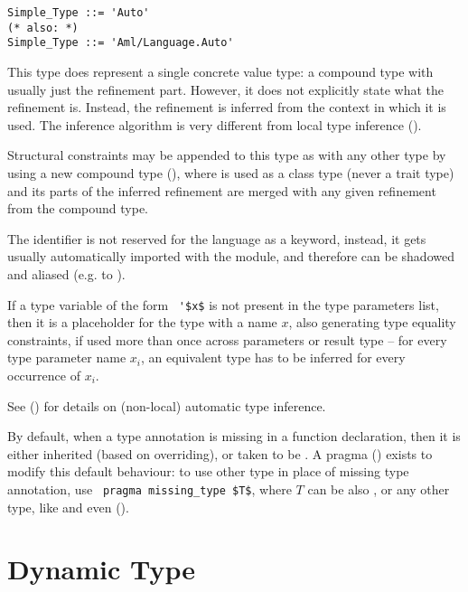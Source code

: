 \syntax\begin{lstlisting}[morekeywords={Auto},deletekeywords={also}]
Simple_Type ::= 'Auto'
(* also: *)
Simple_Type ::= 'Aml/Language.Auto'
\end{lstlisting}

This type does represent a single concrete value type: a compound type with usually just the refinement part. However, it does not explicitly state what the refinement is. Instead, the refinement is inferred from the context in which it is used. The inference algorithm is very different from local type inference (). 

Structural constraints may be appended to this type as with any other type by using a new compound type (), where  is used as a class type (never a trait type) and its parts of the inferred refinement are merged with any given refinement from the compound type. 

The  identifier is not reserved for the language as a keyword, instead, it gets usually automatically imported with the  module, and therefore can be shadowed and aliased (e.g. to ). 

If a type variable of the form ~\lstinline!'$x$! is not present in the type parameters list, then it is a placeholder for the  type with a name $x$, also generating type equality constraints, if used more than once across parameters or result type -- for every type parameter name $x_i$, an equivalent type has to be inferred for every occurrence of $x_i$. 

See () for details on (non-local) automatic type inference. 

By default, when a type annotation is missing in a function declaration, then it is either inherited (based on overriding), or taken to be . A pragma () exists to modify this default behaviour: to use other type in place of missing type annotation, use ~\lstinline!pragma missing_type $T$!, where $T$ can be also , or any other type, like  and even  (). 






\section{Dynamic Type}
\label{sec:dynamic-type}

